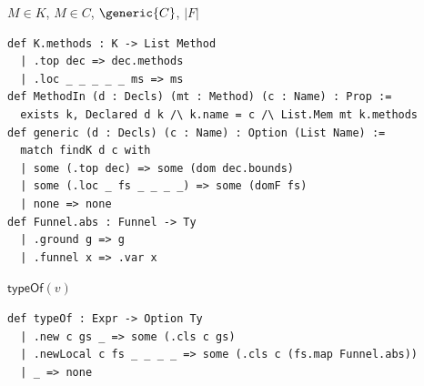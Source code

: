 \begin{cmp}{$M\in K$, $M\in C$, $\generic{C}$, $|F|$}
\begin{paperside}
\end{paperside}
\begin{leanside}
\begin{lstlisting}[style=leanside]
def K.methods : K -> List Method
  | .top dec => dec.methods
  | .loc _ _ _ _ _ ms => ms
def MethodIn (d : Decls) (mt : Method) (c : Name) : Prop :=
  exists k, Declared d k /\ k.name = c /\ List.Mem mt k.methods
def generic (d : Decls) (c : Name) : Option (List Name) :=
  match findK d c with
  | some (.top dec) => some (dom dec.bounds)
  | some (.loc _ fs _ _ _ _) => some (domF fs)
  | none => none
def Funnel.abs : Funnel -> Ty
  | .ground g => g
  | .funnel x => .var x
\end{lstlisting}
\end{leanside}
\end{cmp}

\begin{cmp}{$\mathsf{typeOf}(v)$}
\begin{paperside}
\end{paperside}
\begin{leanside}
\begin{lstlisting}[style=leanside]
def typeOf : Expr -> Option Ty
  | .new c gs _ => some (.cls c gs)
  | .newLocal c fs _ _ _ _ => some (.cls c (fs.map Funnel.abs))
  | _ => none
\end{lstlisting}
\end{leanside}
\end{cmp}


